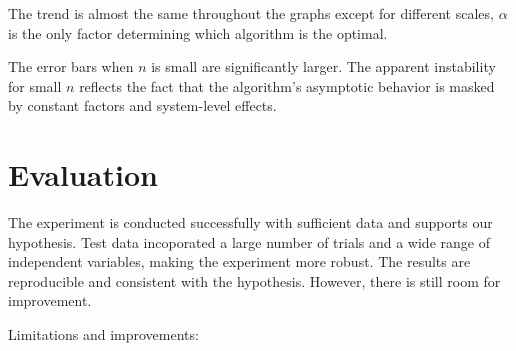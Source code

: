 \documentclass[12pt]{article}
\begin{document}
The trend is almost the same throughout the graphs except for different scales, $\alpha$ is the only factor determining which algorithm is the optimal.

The error bars when $n$ is small are significantly larger. The apparent instability for small $n$ reflects the fact that the algorithm's asymptotic behavior is masked by constant factors and system-level effects.

\section{Evaluation}


The experiment is conducted successfully with sufficient data and supports our hypothesis. Test data incoporated a large number of trials and a wide range of independent variables, making the experiment more robust. The results are reproducible and consistent with the hypothesis. However, there is still room for improvement.

Limitations and improvements:
\end{document}

